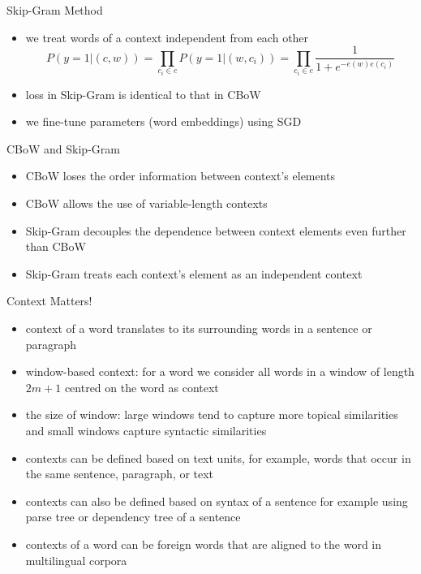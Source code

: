 \begin{frame}{Skip-Gram Method}
\begin{itemize}
    \item<1-> we treat words of a context independent from each other
            \begin{equation*}
                P(y=1|(c,w)) = \prod_{c_i \in c} P(y=1|(w,c_i)) = \prod_{c_i \in c} \frac{1}{1+e^{-e(w)e(c_i)}}
            \end{equation*}
    \item<2-> loss in Skip-Gram is identical to that in CBoW
    \item<3-> we fine-tune parameters (word embeddings) using SGD
\end{itemize}
\end{frame}
\begin{frame}{CBoW and Skip-Gram}
    \begin{itemize}
        \item<1-> CBoW loses the order information between context's elements
        \item<2-> CBoW allows the use of variable-length contexts
        \item<3-> Skip-Gram decouples the dependence between context elements even further than CBoW
        \item<4-> Skip-Gram treats each context's element as an independent context
    \end{itemize}
\end{frame}
\begin{frame}{Context Matters!}
    \begin{itemize}
        \item<1-> context of a word translates to its surrounding words in a sentence or paragraph
        \item<2-> window-based context: for a word  we consider all words in a window of length $2m+1$ centred on the word as context
        \item<3-> the size of window: large windows tend to capture more topical similarities and small windows capture syntactic similarities 
        \item<4-> contexts can be defined based on text units, for example, words that occur in the same sentence, paragraph, or text
        \item<5-> contexts can also be defined based on syntax of a sentence for example using parse tree or dependency tree of a sentence
        \item<6-> contexts of a word can be foreign words that are aligned to the word in multilingual corpora
    \end{itemize}
\end{frame}
